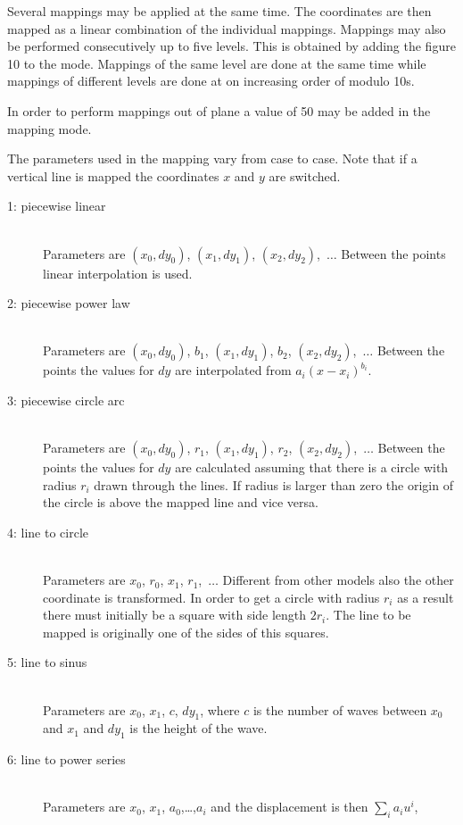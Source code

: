 Several mappings may be applied at the same time. The 
coordinates are then mapped as a linear combination of the 
individual mappings. Mappings may also be performed 
consecutively up to five levels. This is obtained by adding 
the figure 10 to the mode. Mappings of the same 
level are done at the same time while mappings of different levels
are done at on increasing order of modulo 10s.

In order to perform mappings out of plane a value
of 50 may be added in the mapping mode.

The parameters used in the mapping vary from case to case.
Note that if a vertical line is mapped the coordinates $x$ and $y$
are switched.
\begin{description}
\item[1: piecewise linear] \mbox{} \\
Parameters are $(x_0,dy_0)$, $(x_1,dy_1)$, $(x_2,dy_2)$,~$\ldots$
Between the points linear interpolation is used. 
\item[2: piecewise power law] \mbox{} \\
Parameters are
$(x_0,dy_0)$, $b_1$, $(x_1,dy_1)$, $b_2$, $(x_2,dy_2)$,~$\ldots$
Between the points the values for $dy$ are interpolated from
$a_i (x-x_i)^{b_i}$.
\item[3: piecewise circle arc] \mbox{} \\
Parameters are
$(x_0,dy_0)$, $r_1$, $(x_1,dy_1)$, $r_2$, $(x_2,dy_2)$,~$\ldots$
Between the points the values for $dy$ are calculated assuming that
there is a circle with radius $r_i$ drawn through the lines.
If radius is larger than zero the origin of the circle is 
above the mapped line and vice versa.
\item[4: line to circle] \mbox{} \\
Parameters are $x_0$, $r_0$, $x_1$, $r_1$,~$\ldots$
Different from other models also the other coordinate is 
transformed. In order to get a circle with radius $r_i$ 
as a result there must initially be a square with 
side length $2r_i$. The line to be mapped is originally 
one of the sides of this squares.
\item[5: line to sinus] \mbox{} \\
Parameters are $x_0$, $x_1$, $c$, $dy_1$,
where $c$ is the number of waves between $x_0$ and $x_1$
and $dy_1$ is the height of the wave.
\item[6: line to power series] \mbox{} \\	
Parameters are $x_0$, $x_1$, $a_0$,\ldots,$a_i$
and the displacement is then $\sum_i a_i u^i$,

\end{description}

